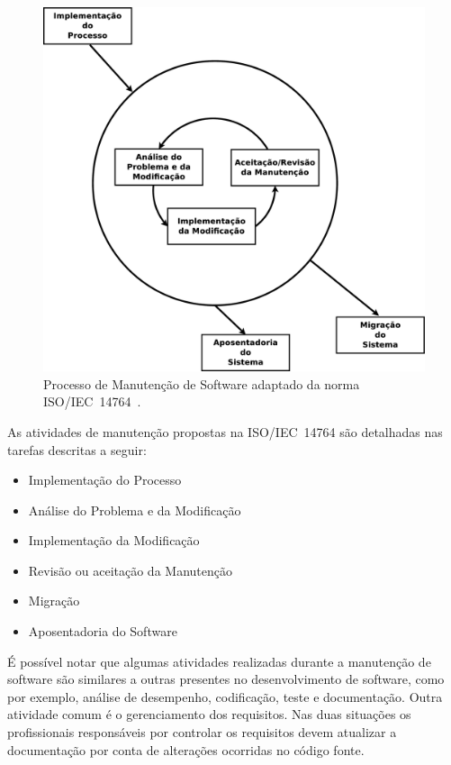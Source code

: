 \begin{figure}[htpb]
    \centering
    \includegraphics[width=0.9\linewidth]
    {chapter-manutencao-software-visao-geral/img/ieee-14764-processo-manutencao.eps}
    \caption{Processo de Manutenção de Software adaptado da norma
        ISO/IEC~14764~\cite{institute2006norma}.}\label{fig:ieee-14764-processo-manutencao}
\end{figure}

As atividades de manutenção propostas na ISO/IEC~14764 são detalhadas nas
tarefas descritas a seguir:

\begin{itemize}
   	\item Implementação do Processo
   	\item Análise do Problema e da Modificação
    \item Implementação da Modificação
	\item Revisão ou aceitação da Manutenção
   	\item Migração
   	\item Aposentadoria do Software
\end{itemize}

É possível notar que algumas atividades realizadas durante a manutenção de
software são similares a outras presentes no desenvolvimento de software, como
por exemplo, análise de desempenho, codificação, teste e documentação. Outra
atividade comum é o gerenciamento dos requisitos. Nas duas situações os
profissionais responsáveis por controlar os requisitos devem atualizar a
do\-cu\-men\-ta\-ção  por conta de alterações ocorridas no código fonte.

